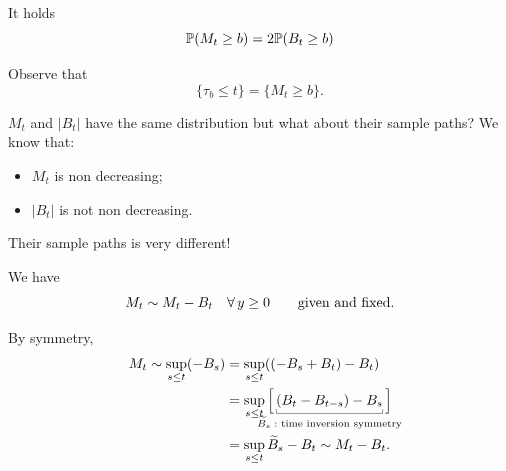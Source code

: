 \documentclass[12pt]{report}
\begin{document}
It holds $$\mathbb{P}(M_{t}\geq b)=2\mathbb{P}(B_{t}\geq b)$$
\begin{fancyproof}
	Observe that 
	\begin{equation*}
		\{\tau_{b}\leq t\}=\{M_{t}\geq b\}.
	\end{equation*}
\end{fancyproof}
	$M_{t}$ and $|B_{t}|$ have the same distribution but what about their sample paths? We know that:
	\begin{itemize}
		\item $M_{t}$ is non decreasing;
		\item $|B_{t}|$ is not non decreasing.
	\end{itemize}
Their sample paths is very different!
\begin{remark}
	We have 
	\begin{equation*}
		M_{t}\sim M_{t}-B_{t}\quad\forall\, y\geq 0 \qquad\text{given and fixed.}
	\end{equation*}
\end{remark}
\begin{fancyproof}
	By symmetry,\begin{align*}
		M_{t}\sim\sup_{s\leq t}(-B_{s})&=\sup_{s\leq t}((-B_{s}+B_{t})-B_{t})\\
		&=\sup_{s\leq t}\Big[\ubracketthin{(B_{t}-B_{t-s})-B_{s}}_{\claptext{$\widetilde{B}_{s}:$ time inversion symmetry}}\Big]\\
		&=\sup_{s\leq t}\widetilde{B}_{s}-B_{t}\sim M_{t}-B_{t}.
	\end{align*}
\end{fancyproof}
\end{document}

